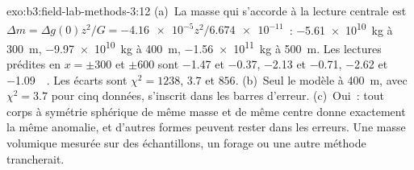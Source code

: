 \begin{solution}{exo:b3:field-lab-methods-3:12}
(a)~La masse qui s'accorde à la lecture centrale est $\Delta m = \Delta g(0)z^2/G
= \num{-4.16e-5}z^2/\num{6.674e-11}$~: \qty{-5.61e10}{kg} à
\qty{300}{m}, \qty{-9.97e10}{kg} à \qty{400}{m}, \qty{-1.56e11}{kg} à
\qty{500}{m}. Les lectures prédites en $x = \pm300$ et $\pm600$ sont
\num{-1.47} et \num{-0.37}, \num{-2.13} et \num{-0.71}, \num{-2.62}
et \qty{-1.09}{\milli\gal}. Les écarts sont $\chi^2 = 1238$, $3.7$ et
$856$. (b)~Seul le modèle à \qty{400}{m}, avec $\chi^2 = 3.7$ pour cinq
données, s'inscrit dans les barres d'erreur. (c)~Oui~: tout corps à symétrie sphérique
de même masse et de même centre donne exactement la même anomalie, et d'autres
formes peuvent rester dans les erreurs. Une masse volumique mesurée sur des échantillons, un
forage ou une autre méthode trancherait.
\end{solution}

